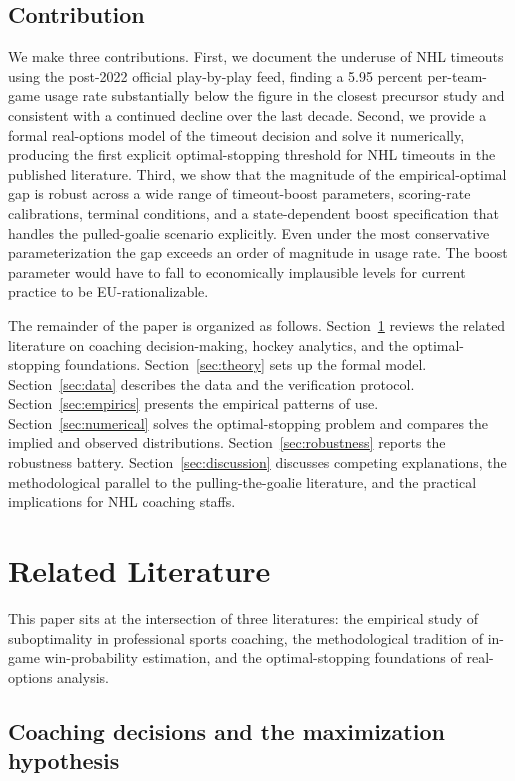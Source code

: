 \documentclass[11pt]{article}
\begin{document}
\subsection{Contribution}

We make three contributions. First, we document the underuse of NHL timeouts using the post-2022 official play-by-play feed, finding a 5.95 percent per-team-game usage rate substantially below the figure in the closest precursor study \citep{Ferer2020} and consistent with a continued decline over the last decade. Second, we provide a formal real-options model of the timeout decision and solve it numerically, producing the first explicit optimal-stopping threshold for NHL timeouts in the published literature. Third, we show that the magnitude of the empirical-optimal gap is robust across a wide range of timeout-boost parameters, scoring-rate calibrations, terminal conditions, and a state-dependent boost specification that handles the pulled-goalie scenario explicitly. Even under the most conservative parameterization the gap exceeds an order of magnitude in usage rate. The boost parameter would have to fall to economically implausible levels for current practice to be EU-rationalizable.

The remainder of the paper is organized as follows. Section~\ref{sec:lit} reviews the related literature on coaching decision-making, hockey analytics, and the optimal-stopping foundations. Section~\ref{sec:theory} sets up the formal model. Section~\ref{sec:data} describes the data and the verification protocol. Section~\ref{sec:empirics} presents the empirical patterns of use. Section~\ref{sec:numerical} solves the optimal-stopping problem and compares the implied and observed distributions. Section~\ref{sec:robustness} reports the robustness battery. Section~\ref{sec:discussion} discusses competing explanations, the methodological parallel to the pulling-the-goalie literature, and the practical implications for NHL coaching staffs.

\section{Related Literature}\label{sec:lit}

This paper sits at the intersection of three literatures: the empirical study of suboptimality in professional sports coaching, the methodological tradition of in-game win-probability estimation, and the optimal-stopping foundations of real-options analysis.

\subsection{Coaching decisions and the maximization hypothesis}
\end{document}
